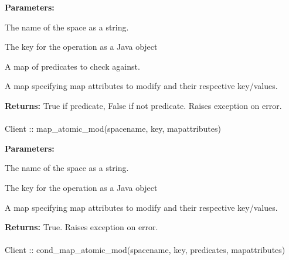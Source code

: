 \noindent\textbf{Parameters:}
\begin{description}[labelindent=\widthof{{\code{mapattributes}}},leftmargin=*,noitemsep,nolistsep,align=right]
\item[\code{spacename}] The name of the space as a string.
\item[\code{key}] The key for the operation as a Java object
\item[\code{predicates}] A map of predicates to check against.
\item[\code{mapattributes}] A map specifying map attributes to modify and their respective key/values.
\end{description}

\noindent\textbf{Returns:}
True if predicate, False if not predicate.  Raises exception on error.

\paragraph{}
\label{api:java:map_atomic_mod}
\begin{javacode}
Client :: map_atomic_mod(spacename, key, mapattributes)
\end{javacode}
\funcdesc 

\noindent\textbf{Parameters:}
\begin{description}[labelindent=\widthof{{\code{mapattributes}}},leftmargin=*,noitemsep,nolistsep,align=right]
\item[\code{spacename}] The name of the space as a string.
\item[\code{key}] The key for the operation as a Java object
\item[\code{mapattributes}] A map specifying map attributes to modify and their respective key/values.
\end{description}

\noindent\textbf{Returns:}
True.  Raises exception on error.

\paragraph{}
\label{api:java:cond_map_atomic_mod}
\begin{javacode}
Client :: cond_map_atomic_mod(spacename, key, predicates, mapattributes)
\end{javacode}
\funcdesc 

